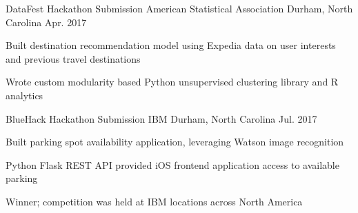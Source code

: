 \begin{cventries}
\cventry
	{DataFest Hackathon Submission} %
	{American Statistical Association} %
	{Durham, North Carolina} %
	{Apr. 2017} %
	{
		\begin{cvitems} %
			\item {Built destination recommendation model using Expedia data on user interests and previous travel destinations}
			\item {Wrote custom modularity based Python unsupervised clustering library and R analytics}
		\end{cvitems}
	}

\cventry
{BlueHack Hackathon Submission} %
{IBM} %
{Durham, North Carolina} %
{Jul. 2017} %
{
	\begin{cvitems} %
		\item {Built parking spot availability application, leveraging Watson image recognition}
		\item {Python Flask REST API provided iOS frontend application access to available parking}
		\item {Winner; competition was held at IBM locations across North America}
	\end{cvitems}
}




\end{cventries}